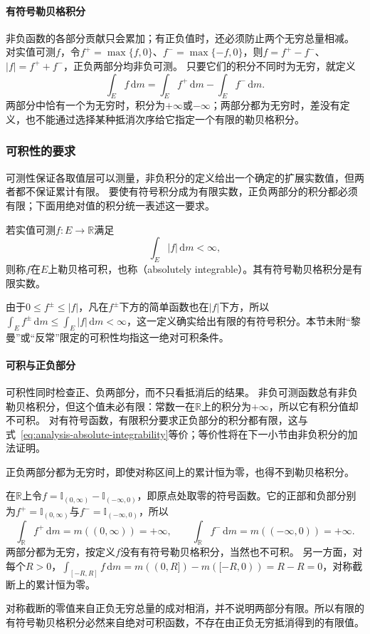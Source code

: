 \paragraph{有符号勒贝格积分}
非负函数的各部分贡献只会累加；有正负值时，还必须防止两个无穷总量相减。
对实值可测$f$，令$f^+=\max\{f,0\}$、$f^-=\max\{-f,0\}$，则$f=f^+-f^-$、$|f|=f^++f^-$，正负两部分均非负可测。
只要它们的积分不同时为无穷，就定义
\[
 \int_Ef\,\mathrm dm=\int_Ef^+\,\mathrm dm-\int_Ef^-\,\mathrm dm.
\]
两部分中恰有一个为无穷时，积分为$+\infty$或$-\infty$；两部分都为无穷时，差没有定义，也不能通过选择某种抵消次序给它指定一个有限的勒贝格积分。

\subsubsection{可积性的要求}

可测性保证各取值层可以测量，非负积分的定义给出一个确定的扩展实数值，但两者都不保证累计有限。
要使有符号积分成为有限实数，正负两部分的积分都必须有限；下面用绝对值的积分统一表述这一要求。

\begin{definition}[勒贝格可积函数]
\label{def:analysis-integrable-function}
若实值可测$f:E\to\mathbb R$满足
\begin{equation}
 \int_E|f|\,\mathrm dm<\infty,
\label{eq:analysis-absolute-integrability}
\end{equation}
则称$f$在$E$上勒贝格可积，也称（absolutely integrable）。其有符号勒贝格积分是有限实数。
\end{definition}
由于$0\leq f^\pm\leq|f|$，凡在$f^\pm$下方的简单函数也在$|f|$下方，所以$\int_Ef^\pm\,\mathrm dm\leq\int_E|f|\,\mathrm dm<\infty$，这一定义确实给出有限的有符号积分。本节未附“黎曼”或“反常”限定的可积性均指这一绝对可积条件。

\paragraph{可积与正负部分}
可积性同时检查正、负两部分，而不只看抵消后的结果。
非负可测函数总有非负勒贝格积分，但这个值未必有限：常数一在$\mathbb R$上的积分为$+\infty$，所以它有积分值却不可积。
对有符号函数，有限积分要求正负部分的积分都有限，这与式~\eqref{eq:analysis-absolute-integrability}等价；等价性将在下一小节由非负积分的加法证明。

正负两部分都为无穷时，即使对称区间上的累计恒为零，也得不到勒贝格积分。
\begin{example}[符号函数在实轴上没有勒贝格积分]
\label{ex:analysis-sign-function-no-integral}
在$\mathbb R$上令$f=\mathbb I_{(0,\infty)}-\mathbb I_{(-\infty,0)}$，即原点处取零的符号函数。它的正部和负部分别为$f^+=\mathbb I_{(0,\infty)}$与$f^-=\mathbb I_{(-\infty,0)}$，所以
\[
 \int_{\mathbb R}f^+\,\mathrm dm=m((0,\infty))=+\infty,\qquad
 \int_{\mathbb R}f^-\,\mathrm dm=m((-\infty,0))=+\infty.
\]
两部分都为无穷，按定义$f$没有有符号勒贝格积分，当然也不可积。
另一方面，对每个$R>0$，$\int_{[-R,R]}f\,\mathrm dm=m((0,R])-m([-R,0))=R-R=0$，对称截断上的累计恒为零。
\end{example}
对称截断的零值来自正负无穷总量的成对相消，并不说明两部分有限。所以有限的有符号勒贝格积分必然来自绝对可积函数，不存在由正负无穷抵消得到的有限值。

